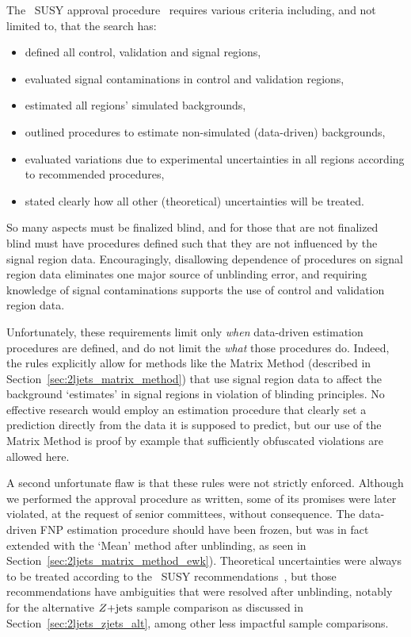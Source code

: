 The \atlas\ SUSY approval procedure~\cite{atlas_twiki_susyapprove}
requires various criteria including, and not limited to, that the search has:
\begin{itemize}
\item defined all control, validation and signal regions,
\item evaluated signal contaminations in control and validation regions,
\item estimated all regions' simulated backgrounds,
\item outlined procedures to estimate non-simulated (data-driven) backgrounds,
\item evaluated variations due to experimental uncertainties in all regions
according to recommended procedures,
\item stated clearly how all other (theoretical) uncertainties will be treated.
\end{itemize}
So many aspects must be finalized blind, and for those that are not
finalized blind must have procedures defined such that they are not
influenced by the signal region data.
Encouragingly, disallowing dependence of procedures on signal region data
eliminates one major source of unblinding error,
and requiring knowledge of signal contaminations supports the use of control
and validation region data.

Unfortunately, these requirements limit only \emph{when} data-driven estimation
procedures are defined, and do not limit the \emph{what} those procedures do.
Indeed, the rules explicitly allow for methods like the Matrix Method
(described in Section~\ref{sec:2ljets_matrix_method})
that use signal region data to affect the background `estimates' in signal
regions in violation of blinding principles.
No effective research would employ an estimation procedure that clearly set
a prediction directly from the data it is supposed to predict, but our use of
the Matrix Method is proof by example that sufficiently obfuscated violations
are allowed here.

A second unfortunate flaw is that these rules were not strictly enforced.
Although we performed the approval procedure as written, some of its promises
were later violated, at the request of senior committees, without consequence.
The data-driven FNP estimation procedure should have been frozen, but was in
fact extended with the `Mean' method after unblinding,
as seen in Section~\ref{sec:2ljets_matrix_method_ewk}).
Theoretical uncertainties were always to be treated according to the
\atlas\ SUSY recommendations~\cite{atlas_twiki_susytheoretical}, but those
recommendations have ambiguities that were resolved after unblinding,
notably for the alternative $Z\mathrm{+jets}$ sample comparison as discussed in
Section~\ref{sec:2ljets_zjets_alt}, among other less impactful sample
comparisons.

